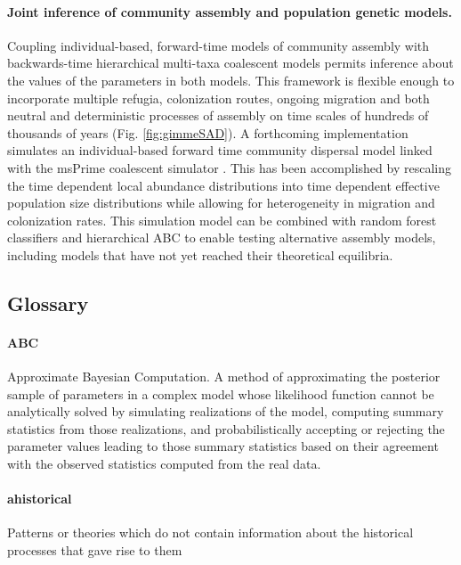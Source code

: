 \documentclass[12pt]{article}
\begin{document}
\paragraph{Joint inference of community assembly and population
  genetic models.} Coupling individual-based, forward-time models of
community assembly with backwards-time hierarchical multi-taxa
coalescent models permits inference about the values of the parameters
in both models. This framework is flexible enough to incorporate
multiple refugia, colonization routes, ongoing migration and both
neutral and deterministic processes of assembly on time scales of
hundreds of thousands of years (Fig. \ref{fig:gimmeSAD}). A
forthcoming implementation \citep[gimmeSAD$\pi$;][]{overcast}
simulates an individual-based forward time community dispersal model
\citep{Rosindell2015-dk} linked with the msPrime coalescent simulator
\citep{kelleher2016}. This has been accomplished by rescaling the time
dependent local abundance distributions into time dependent effective
population size distributions while allowing for heterogeneity in
migration and colonization rates. This simulation model can be
combined with random forest classifiers and hierarchical ABC to enable
testing alternative assembly models, including models that have not
yet reached their theoretical equilibria.


\subsection*{Glossary}

\paragraph{ABC} Approximate Bayesian Computation. A method of
approximating the posterior sample of parameters in a complex model
whose likelihood function cannot be analytically solved by simulating
realizations of the model, computing summary statistics from those
realizations, and probabilistically accepting or rejecting the
parameter values leading to those summary statistics based on their
agreement with the observed statistics computed from the real data.

\paragraph{ahistorical} Patterns or theories which do not contain
information about the historical processes that gave rise to them
\end{document}

